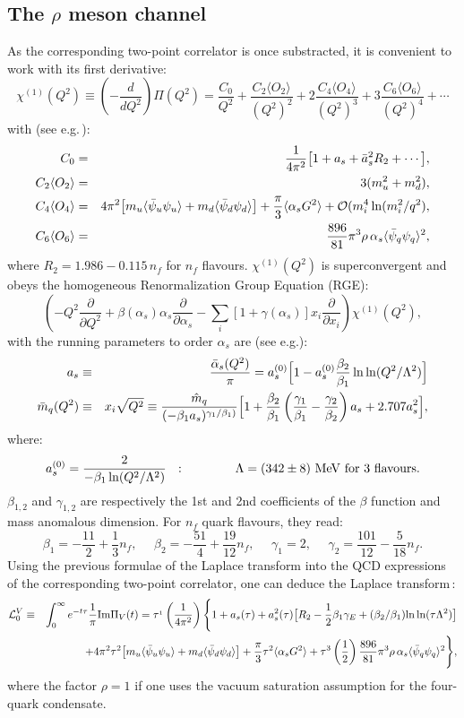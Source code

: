 \documentclass[aps,prd,groupedaddress,nofootinbib]{revtex4-1}
\def\beq{\begin{equation}}
\def\eeq{\end{equation}}
\def\bea{\begin{eqnarray}}
\def\eea{\end{eqnarray}}
\def\nnb{\nonumber}
\def\ga{\left(}
\def\dr{\right)}
\def\nnb{\nonumber}
\def\la{\langle}
\def\ra{\rangle}
\begin{document}
\subsection{The $\rho$ meson channel}
As the corresponding two-point correlator is once substracted, it is convenient to work with its first derivative:
\beq
\chi^{(1)}(Q^2)\equiv \ga-\frac{d}{dQ^2}\dr \Pi(Q^2) = \frac{C_0}{Q^2}+\frac{C_2\la O_2\ra}{(Q^2)^2}+2\frac{C_4\la O_4\ra}{(Q^2)^3}+3\frac{C_6\la O_6\ra}{(Q^2)^4}+\cdots
\eeq
with (see e.g.\,\cite{SNB1,SNB2}):
\bea
C_0&=&\frac{1}{4\pi^2}\big{[}1+ a_s + \bar a_s^2R_2+\cdots\big{]},\nnb\\
C_2\la O_2\ra&=&3(m_u^2+m_d^2),\nnb\\
C_4\la O_4\ra&=&4\pi^2\big{[}m_u\la \bar \psi_u\psi_u\ra+m_d\la \bar \psi_d\psi_d\ra\big{]}+\frac{\pi}{3}\la\alpha_s G^2\ra +{\cal O}(m^4_i\,{\rm ln} (m_i^2/q^2),\nnb\\
C_6\la O_6\ra&=&\frac{896}{81}\pi^3 \rho\,\alpha_s\la\bar \psi_q\psi_q\ra^2,
\eea
where $R_2=1.986-0.115\,n_f$ for $n_f$ flavours.  $\chi^{(1)}(Q^2)$
 is superconvergent and obeys the homogeneous Renormalization Group Equation (RGE):
\beq
\ga-Q^2\frac{\partial}{\partial Q^2}+\beta(\alpha_s)\alpha_s\frac{\partial}{\partial\alpha_s}-\sum_i[1+\gamma(\alpha_s)] x_i\frac{\partial}{\partial x_i}\dr \chi^{(1)}(Q^2),
\label{eq:rge}
\eeq
with the running parameters to order $\alpha_s$ are (see e.g.\cite{FNR,RUNDEC,SNB1,SNB2}):
\bea
 a_s&\equiv& \frac{\bar \alpha_s(Q^2)}{\pi} = a_s^{(0)}\Big{[}1-a_s^{(0)}\frac{\beta_2}{\beta_1}\,{\rm ln\, ln}(Q^2/\Lambda^2)\Big{]} \nnb\\
\bar m_q(Q^2)&\equiv& x_i\sqrt{Q^2}\equiv \frac{\hat m_q}{(-\beta_1 a_s)^{\gamma_1/\beta_1)}}\Big{[} 1+\frac{\beta_2}{\beta_1}\ga \frac{\gamma_1}{\beta_1}-\frac{\gamma_2}{\beta_2}\dr a_s+2.707a_s^2\Big{]},
\label{eq:run}
\eea
where:
\beq
a_s^{(0)}=\frac{2}{-\beta_1\,{\rm ln}(Q^2/\Lambda^2)}~~ :  ~~~~~~~~~~~~\Lambda= (342\pm8)~{\rm MeV} ~{\rm for~3~flavours}.
\eeq
$\beta_{1,2}$ and $\gamma_{1,2}$ are respectively the 1st and 2nd coefficients of the $\beta$ function and mass anomalous dimension. For $n_f$ quark flavours, they read:
\beq
\beta_1=-\frac{11}{2}+\frac{1}{3}n_f,~~~~~~\beta_2=-\frac{51}{4}+\frac{19}{12}n_f, ~~~~~~\gamma_1=2,~~~~~ ~\gamma_2=\frac{101}{12}-\frac{5}{18}n_f. 
\eeq
Using the previous formulae of the Laplace transform into the QCD expressions of the corresponding two-point correlator, one can deduce the Laplace transform\,\cite{SNR,SNB1,SNB2}:
\bea
{\cal L}^V_0&\equiv& \int_0^\infty e^{-t\tau}\frac{1}{\pi}{\rm Im}\Pi_V(t)= \tau^{_1}\ga\frac{1}{4\pi^2}\dr\Bigg{\{}1+a_s(\tau)+a_s^2(\tau)\big{[}R_2-\frac{1}{2}\beta_1\gamma_E+(\beta_2/\beta_1){\rm ln\,ln}(\tau\Lambda^2)\big{]}\nnb\\
&&+4\pi^2\tau^2\big{[}m_u\la \bar \psi_u\psi_u\ra+m_d\la \bar \psi_d\psi_d\ra\big{]}+\frac{\pi}{3}\tau^2\la\alpha_s G^2\ra + \tau^3 \ga\frac{1}{2}\dr\frac{896}{81}\pi^3 \rho\,\alpha_s\la\bar \psi_q\psi_q\ra^2\Bigg{\}},
\eea
where the factor $\rho=1$ if one uses the vacuum saturation assumption for the four-quark condensate. 
\end{document}
